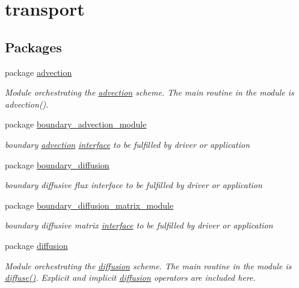 \hypertarget{a00098}{
\section{transport}
\label{a00098}
}
\subsection*{Packages}
\begin{CompactItemize}
\item 
package \hyperlink{a00052}{advection}
\begin{CompactList}\small\item\em Module orchestrating the \hyperlink{a00052}{advection} scheme. The main routine in the module is advection(). \item\end{CompactList}

\item 
package \hyperlink{a00053}{boundary\_\-advection\_\-module}
\begin{CompactList}\small\item\em boundary \hyperlink{a00052}{advection} \hyperlink{a00004}{interface} to be fulfilled by driver or application \item\end{CompactList}

\item 
package \hyperlink{a00054}{boundary\_\-diffusion}
\begin{CompactList}\small\item\em boundary diffusive flux interface to be fulfilled by driver or application \item\end{CompactList}

\item 
package \hyperlink{a00055}{boundary\_\-diffusion\_\-matrix\_\-module}
\begin{CompactList}\small\item\em boundary diffusive matrix \hyperlink{a00003}{interface} to be fulfilled by driver or application \item\end{CompactList}

\item 
package \hyperlink{a00056}{diffusion}
\begin{CompactList}\small\item\em Module orchestrating the \hyperlink{a00056}{diffusion} scheme. The main routine in the module is \hyperlink{a00056_b108f04e81c5fda27fe18ee2aa18086c}{diffuse()}. Explicit and implicit \hyperlink{a00056}{diffusion} operators are included here. \item\end{CompactList}


\end{CompactItemize}
